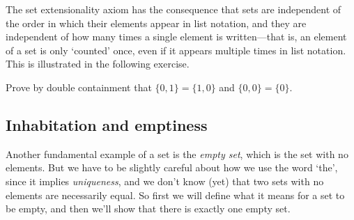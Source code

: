 The set extensionality axiom has the consequence that sets are independent of the order in which their elements appear in list notation, and they are independent of how many times a single element is written---that is, an element of a set is only `counted' once, even if it appears multiple times in list notation. This is illustrated in the following exercise.

\begin{exercise}
Prove by double containment that $\{ 0, 1 \} = \{ 1, 0 \}$ and $\{ 0, 0 \} = \{ 0 \}$.
\end{exercise}

\subsection*{Inhabitation and emptiness}

Another fundamental example of a set is the \textit{empty set}, which is the set with no elements. But we have to be slightly careful about how we use the word `the', since it implies \textit{uniqueness}, and we don't know (yet) that two sets with no elements are necessarily equal. So first we will define what it means for a set to be empty, and then we'll show that there is exactly one empty set.

